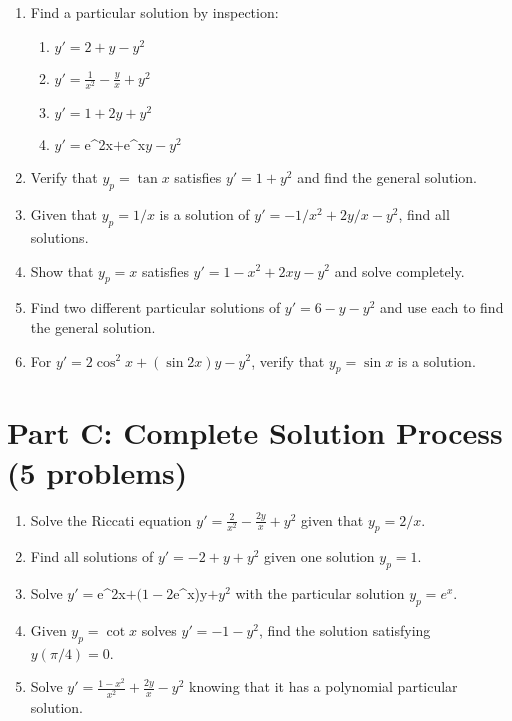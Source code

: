 \documentclass[12pt]{article}
\begin{document}
\begin{enumerate}[resume]
    \item Find a particular solution by inspection:
    \begin{enumerate}[label=(\alph*)]
        \item $y' = 2 + y - y^2$
        \item $y' = \frac{1}{x^2} - \frac{y}{x} + y^2$
        \item $y' = 1 + 2y + y^2$
        \item $y' = $e^{2x}$ + $e^x$ y - y^2$
    \end{enumerate}

    \item Verify that $y_p = \tan x$ satisfies $y' = 1 + y^2$ and find the general solution.

    \item Given that $y_p = 1/x$ is a solution of $y' = -1/x^2 + 2y/x - y^2$, find all solutions.

    \item Show that $y_p = x$ satisfies $y' = 1 - x^2 + 2xy - y^2$ and solve completely.

    \item Find two different particular solutions of $y' = 6 - y - y^2$ and use each to find the general solution.

    \item For $y' = 2\cos^2 x + (\sin 2x)y - y^2$, verify that $y_p = \sin x$ is a solution.
\end{enumerate}

\section*{Part C: Complete Solution Process (5 problems)}

\begin{enumerate}[resume]
    \item Solve the Riccati equation $y' = \frac{2}{x^2} - \frac{2y}{x} + y^2$ given that $y_p = 2/x$.

    \item Find all solutions of $y' = -2 + y + y^2$ given one solution $y_p = 1$.

    \item Solve $y' = $e^{2x}$ + (1 - 2$e^x)y$ + y^2$ with the particular solution $y_p = e^x$.

    \item Given $y_p = \cot x$ solves $y' = -1 - y^2$, find the solution satisfying $y(\pi/4) = 0$.

    \item Solve $y' = \frac{1 - x^2}{x^2} + \frac{2y}{x} - y^2$ knowing that it has a polynomial particular solution.
\end{enumerate}
\end{document}
